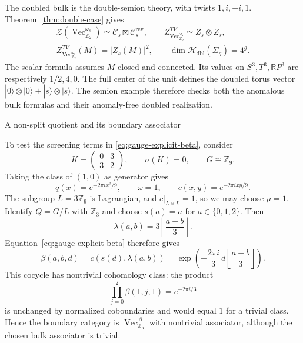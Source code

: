 \documentclass[12pt]{amsart}
\makeatletter
\renewcommand\subsection{\@startsection{subsection}{2}%
  \z@{.5\linespacing\@plus.7\linespacing}{-.5em}%
  {\normalfont\bfseries}}
\numberwithin{equation}{section}
\theoremstyle{definition}
\makeatother
\begin{document}
The doubled bulk is the double-semion theory, with twists
$1,i,-i,1$. Theorem~\ref{thm:double-case} gives
\begin{equation}
\label{eq:semion-double}
\begin{gathered}
\mathcal Z(\operatorname{Vec}_{\mathbb Z_2}^{\omega_s})
\simeq\mathcal C_s\boxtimes\mathcal C_s^{\mathrm{rev}},\qquad
Z^{TV}_{\operatorname{Vec}_{\mathbb Z_2}^{\omega_s}}
\simeq Z_s\otimes\overline{Z_s},\\
Z^{TV}_{\operatorname{Vec}_{\mathbb Z_2}^{\omega_s}}(M)=|Z_s(M)|^2,
\qquad \dim\mathcal H_{\mathrm{dbl}}(\Sigma_g)=4^g.
\end{gathered}
\end{equation}
The scalar formula assumes $M$ closed and connected. Its values on
$S^3,T^3,\mathbb RP^3$ are respectively $1/2,4,0$.
The full center of the unit defines the doubled torus vector
$|0\rangle\otimes\overline{|0\rangle}
+|s\rangle\otimes\overline{|s\rangle}$.
The semion example therefore checks both the anomalous bulk formulas
and their anomaly-free doubled realization.

\subsection{A non-split quotient and its boundary associator}

To test the screening terms in
\eqref{eq:gauge-explicit-beta}, consider
$$
K=\begin{pmatrix}0&3\\3&2\end{pmatrix},
\qquad \sigma(K)=0,\qquad
G\cong\mathbb Z_9.
$$
Taking the class of $(1,0)$ as generator gives
$$
q(x)=e^{-2\pi i x^2/9},\qquad
\omega=1,\qquad c(x,y)=e^{-2\pi i xy/9}.
$$
The subgroup $L=3\mathbb Z_9$ is Lagrangian, and
$c|_{L\times L}=1$, so we may choose $\mu=1$.
Identify $Q=G/L$ with $\mathbb Z_3$ and choose
$s(a)=a$ for $a\in\{0,1,2\}$. Then
$$
\lambda(a,b)=3\left\lfloor\frac{a+b}{3}\right\rfloor.
$$
Equation~\eqref{eq:gauge-explicit-beta} therefore gives
$$
\beta(a,b,d)
=c(s(d),\lambda(a,b))
=\exp\!\left(
-\frac{2\pi i}{3}\,
d\left\lfloor\frac{a+b}{3}\right\rfloor
\right).
$$
This cocycle has nontrivial cohomology class: the product
$$
\prod_{j=0}^{2}\beta(1,j,1)=e^{-2\pi i/3}
$$
is unchanged by normalized coboundaries and would equal $1$
for a trivial class. Hence the boundary category is
$\operatorname{Vec}_{\mathbb Z_3}^{\,\beta}$ with nontrivial
associator, although the chosen bulk associator is trivial.



\renewcommand{\refname}{References}

\end{document}
